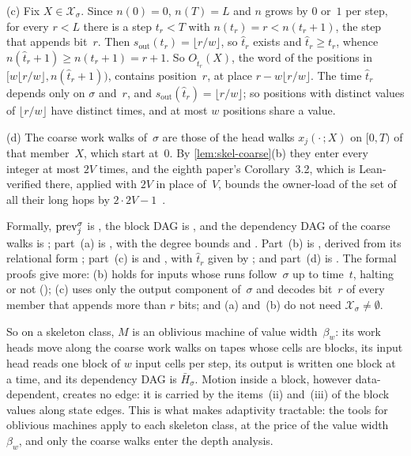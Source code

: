 \begin{outline}
(c) Fix $X\in\mathcal X_\sigma$. Since $n(0)=0$, $n(T)=L$ and $n$ grows by $0$ or~$1$ per step, for every $r<L$ there is
a step $t_r<T$ with $n(t_r)=r<n(t_r+1)$, the step that appends bit~$r$. Then $s_{\mathrm{out}}(t_r)=\lfloor r/w\rfloor$,
so $\hat t_r$ exists and $\hat t_r\ge t_r$, whence $n(\hat t_r+1)\ge n(t_r+1)=r+1$. So $O_{\hat t_r}(X)$, the word of
the positions in $[w\lfloor r/w\rfloor,n(\hat t_r+1))$, contains position~$r$, at place $r-w\lfloor r/w\rfloor$. The
time $\hat t_r$ depends only on $\sigma$ and~$r$, and $s_{\mathrm{out}}(\hat t_r)=\lfloor r/w\rfloor$; so positions with
distinct values of $\lfloor r/w\rfloor$ have distinct times, and at most $w$ positions share a value.

(d) The coarse work walks of~$\sigma$ are those of the head walks $x_j(\cdot\,;X)$ on $[0,T)$ of that member~$X$, which
start at~$0$. By \cref{lem:skel-coarse}(b) they enter every integer at most $2V$ times, and the eighth paper's
Corollary~3.2, which is Lean-verified there, applied with $2V$ in place of~$V$, bounds the owner-load of the set of all
their long hops by $2\cdot2V-1$~\cite[Corollary~3.2]{BoundedNesting2026}.

Formally, $\mathrm{prev}^\sigma_j$ is , the block DAG is , and the
dependency DAG of the coarse walks is ; part~(a) is , with the
degree bounds  and . Part~(b) is
, derived from its relational form
; part~(c) is  and
, with $\hat t_r$ given by ; and part~(d) is
. The formal proofs give more: (b) holds for inputs whose runs follow~$\sigma$
up to time~$t$, halting or not (); (c) uses only the output component
of~$\sigma$ and decodes bit~$r$ of every member that appends more than $r$ bits; and (a) and~(b) do not need
$\mathcal X_\sigma\ne\emptyset$.
\end{outline}

So on a skeleton class, $M$ is an oblivious machine of value width~$\beta_w$: its work heads move along the coarse work
walks on tapes whose cells are blocks, its input head reads one block of $w$ input cells per step, its output is written
one block at a time, and its dependency DAG is $\bar H_\sigma$. Motion inside a block, however data-dependent, creates
no edge: it is carried by the items~(ii) and~(iii) of the block values along state edges. This is what makes adaptivity
tractable: the tools for oblivious machines apply to each skeleton class, at the price of the value width~$\beta_w$, and
only the coarse walks enter the depth analysis.

